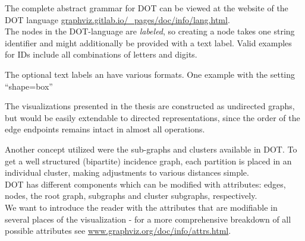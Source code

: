 \documentclass[a4paper, 12pt, bibliography=totoc]{scrartcl}
\begin{document}


The complete abstract grammar for DOT can be viewed at the website of the DOT language \url{graphviz.gitlab.io/_pages/doc/info/lang.html}.\\


The nodes in the DOT-language are \emph{labeled}, so creating a node takes one string identifier and might additionally be provided with a text label. Valid examples for IDs include all combinations of letters and digits.

The optional text labels an have various formats. One example with the setting ``shape=box''

The visualizations presented in the thesis are constructed as undirected graphs, but would be easily extendable to directed representations, since the order of the edge endpoints remains intact in almost all operations.

Another concept utilized were the sub-graphs and clusters available in DOT.
To get a well structured (bipartite) incidence graph, each partition is placed in an individual cluster, making adjustments to various distances simple.\\


DOT has different components which can be modified with attributes: edges, nodes, the root graph, subgraphs and cluster subgraphs, respectively.\\
We want to introduce the reader with the attributes that are modifiable in several places of the visualization - for a more comprehensive breakdown of all possible attributes see \url{www.graphviz.org/doc/info/attrs.html}.
\end{document}
